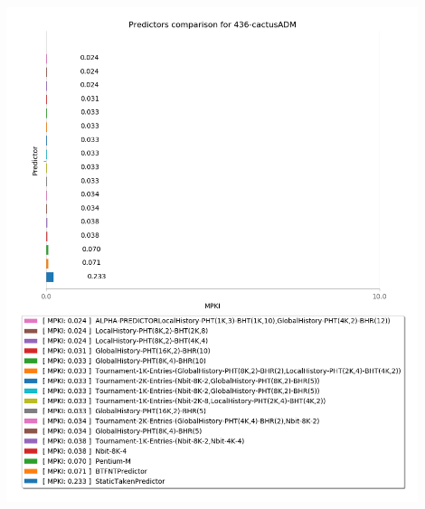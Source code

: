    \begin{minipage}{\textwidth}
      \begin{center}
         \\
         \vspace{3mm}
         \includegraphics[width=0.9\textwidth, frame]{./graphs/4-5/436-cactusADM.png}
         \vspace{6mm}
      \end{center}
   \end{minipage}


